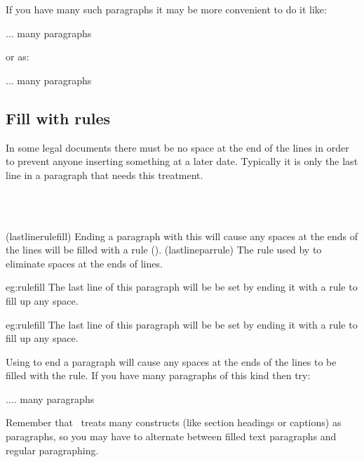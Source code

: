 If you have many such paragraphs it may be more convenient to do it like:
\begin{lcode}
\let\par\russianpar
... many paragraphs
\let\par\memorigpar
\end{lcode}
or as:
\begin{lcode}
\begingroup%
\let\par\russianpar
... many paragraphs
\endgroup%
\end{lcode}


\subsection{Fill with rules}

    In some legal documents there must be no space at the end of the lines
in order to prevent anyone inserting something at a later date. Typically 
it is only the last line in a paragraph that needs this treatment.

\begin{syntax}
\cmd{\lastlinerulefill} \\
\cmd{\lastlineparrule} \\
\end{syntax}
\glossary(lastlinerulefill)%
  {}%
  {Ending a paragraph with this will cause any spaces at the ends of 
   the lines will be filled with a rule ().}
\glossary(lastlineparrule)%
  {}%
  {The rule used by  to eliminate spaces at 
   the ends of lines.}

\begin{egresult}{eg:rulefill}
The last line of this paragraph will be be set by ending it with
a rule to fill up any space.\lastlinerulefill
\end{egresult}


\begin{egsource}{eg:rulefill}
The last line of this paragraph will be be set by ending it with
a rule to fill up any space.\lastlinerulefill
\end{egsource}


Using \cmd{\lastlinerulefill} to end a paragraph will cause any spaces
at the ends of the lines to be filled with the \cmd{\lastlineparrule} rule.
If you have many paragraphs of this kind then try:
\begin{lcode}
\let\par\lastlinerulefill
.... many paragraphs
\let\par\memorigpar
\end{lcode}
Remember that \ltx\ treats many constructs (like section headings or captions)
as paragraphs, so you may have to alternate between filled text paragraphs
and regular paragraphing.



